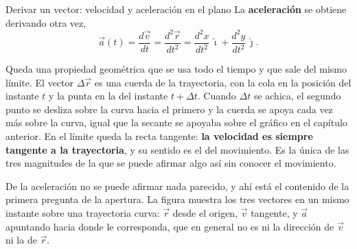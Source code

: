 \documentclass[11pt,openany]{book}
\begin{document}
\begin{bloque}{Derivar un vector: velocidad y aceleración en el plano}
La \textbf{aceleración} se obtiene derivando otra vez,
\[
\vec a(t) = \frac{d\vec v}{dt} = \frac{d^2\vec r}{dt^2} = \frac{d^2x}{dt^2}\,\hat\imath + \frac{d^2y}{dt^2}\,\hat\jmath.
\]

Queda una propiedad geométrica que se usa todo el tiempo y que sale del mismo límite. El vector $\Delta\vec r$ es una cuerda de la trayectoria, con la cola en la posición del instante $t$ y la punta en la del instante $t+\Delta t$. Cuando $\Delta t$ se achica, el segundo punto se desliza sobre la curva hacia el primero y la cuerda se apoya cada vez más sobre la curva, igual que la secante se apoyaba sobre el gráfico en el capítulo anterior. En el límite queda la recta tangente: \textbf{la velocidad es siempre tangente a la trayectoria}, y su sentido es el del movimiento. Es la única de las tres magnitudes de la que se puede afirmar algo así sin conocer el movimiento.

De la aceleración no se puede afirmar nada parecido, y ahí está el contenido de la primera pregunta de la apertura. La figura muestra los tres vectores en un mismo instante sobre una trayectoria curva: $\vec r$ desde el origen, $\vec v$ tangente, y $\vec a$ apuntando hacia donde le corresponda, que en general no es ni la dirección de $\vec v$ ni la de $\vec r$.

\begin{center}
\end{center}


\end{bloque}
\end{document}
